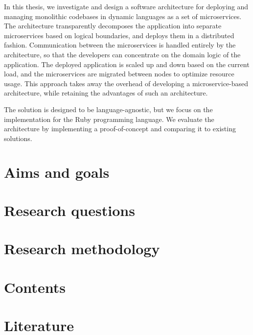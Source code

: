 \documentclass[12pt]{article}
\begin{document}
	In this thesis, we investigate and design a software architecture for deploying and managing monolithic codebases in dynamic languages as a set of microservices.
	The architecture transparently decomposes the application into separate microservices based on logical boundaries, and deploys them in a distributed fashion.
	Communication between the microservices is handled entirely by the architecture, so that the developers can concentrate on the domain logic of the application.
	The deployed application is scaled up and down based on the current load, and the microservices are migrated between nodes to optimize resource usage.
	This approach takes away the overhead of developing a microservice-based architecture, while retaining the advantages of such an architecture.

	The solution is designed to be language-agnostic, but we focus on the implementation for the Ruby programming language.
	We evaluate the architecture by implementing a proof-of-concept and comparing it to existing solutions.

	\clearpage

	\section{Aims and goals}\label{sec:aims-and-goals}

	\clearpage

	\section{Research questions}\label{sec:research-questions}

	\clearpage

	\section{Research methodology}\label{sec:research-methodology}

	\clearpage

	\section{Contents}\label{sec:contents}

	\clearpage

	\section{Literature}\label{sec:literature}

	\clearpage


	\nocite{*}

	\printbibliography[heading=bibintoc]
\end{document}
